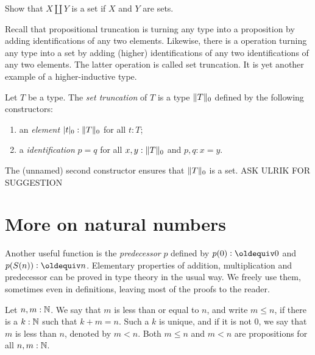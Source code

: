 \begin{xca}\label{xca:set-sum}
Show that $X\amalg Y$ is a set if $X$ and $Y$ are sets.
\end{xca}

Recall that propositional truncation is turning any type into
a proposition by adding identifications of any two elements.
Likewise, there is a operation turning any type into a set
by adding (higher) identifications of any two identifications
of any two elements. The latter operation is called set truncation.
It is yet another example of a higher-inductive type.

\begin{definition}\label{def:set-truncation}
Let $T$ be a type. The \emph{set truncation} of $T$
is a type  $\lVert T\rVert_0$ defined by the following constructors:
\begin{enumerate}
\item an \emph{element} $\lvert t\rvert_0 : \lVert T\rVert_0$ for all $t:T$;
\item a \emph{identification} $p=q$ for all $x,y:\lVert T\rVert_0$ and $p,q: x=y$.
\end{enumerate}
The (unnamed) second constructor ensures that $\lVert T\rVert_0$ is a
set. ASK ULRIK FOR SUGGESTION
\end{definition}


\section{More on natural numbers}
\label{sec:more-on-N}

Another useful function is the \emph{predecessor} $p$ defined by
$p(0)\defeq 0$ and $p(S(n))\defeq n$.
Elementary properties of addition, multiplication and predecessor
can be proved in type theory in the usual way.
We freely use them, sometimes even in definitions, leaving most of the
proofs to the reader.

\begin{definition}
\label{def:orderonN}
Let $n,m:\mathbb{N}$. We say that $m$ is less than or equal to $n$, and write $m\leq n$,
if there is a $k:\mathbb{N}$ such that $k+m=n$. Such a $k$ is unique, and if it
is not $0$, we say that $m$ is less than $n$, denoted by $m<n$.
Both $m\leq n$ and $m<n$ are propositions for all $n,m:\mathbb{N}$.
\end{definition}

